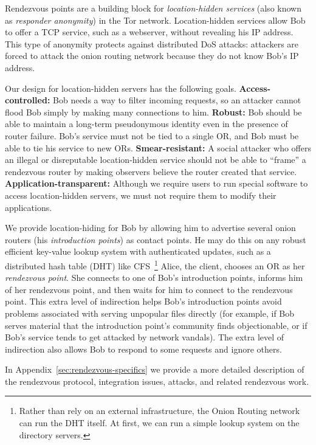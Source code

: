 \documentclass[times,10pt,twocolumn]{article}
\begin{document}
Rendezvous points are a building block for \emph{location-hidden
services} (also known as \emph{responder anonymity}) in the Tor
network.  Location-hidden services allow Bob to offer a TCP
service, such as a webserver, without revealing his IP address.
This type of anonymity protects against distributed DoS attacks:
attackers are forced to attack the onion routing network
because they do not know Bob's IP address.

Our design for location-hidden servers has the following goals.
\textbf{Access-controlled:} Bob needs a way to filter incoming requests,
so an attacker cannot flood Bob simply by making many connections to him.
\textbf{Robust:} Bob should be able to maintain a long-term pseudonymous
identity even in the presence of router failure. Bob's service must
not be tied to a single OR, and Bob must be able to tie his service
to new ORs. \textbf{Smear-resistant:}
A social attacker who offers an illegal or disreputable location-hidden
service should not be able to ``frame'' a rendezvous router by
making observers believe the router created that service.
\textbf{Application-transparent:} Although we require users
to run special software to access location-hidden servers, we must not
require them to modify their applications.

We provide location-hiding for Bob by allowing him to advertise
several onion routers (his \emph{introduction points}) as contact
points. He may do this on any robust efficient
key-value lookup system with authenticated updates, such as a
distributed hash table (DHT) like CFS~\cite{cfs:sosp01}\footnote{
Rather than rely on an external infrastructure, the Onion Routing network
can run the DHT itself.  At first, we can run a simple lookup
system on the
directory servers.} Alice, the client, chooses an OR as her
\emph{rendezvous point}. She connects to one of Bob's introduction
points, informs him of her rendezvous point, and then waits for him
to connect to the rendezvous point. This extra level of indirection
helps Bob's introduction points avoid problems associated with serving
unpopular files directly (for example, if Bob serves
material that the introduction point's community finds objectionable,
or if Bob's service tends to get attacked by network vandals).
The extra level of indirection also allows Bob to respond to some requests
and ignore others.

In Appendix~\ref{sec:rendezvous-specifics} we provide a more detailed
description of the rendezvous protocol, integration issues, attacks,
and related rendezvous work.
\end{document}
